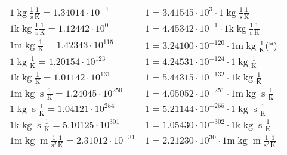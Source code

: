 \begin{center}
\begin{longtable}{l l}
{\color{black}$1 \bm{\mathrm{ }}\operatorname{kg}{}\frac1{\operatorname{s}}{}\frac1{\operatorname{K}} = 1.34014\cdot10^{-4} $}   & {\color{black}$ 1 = 3.41545\cdot10^{3} \cdot 1 \bm{\mathrm{ }}\operatorname{kg}{}\frac1{\operatorname{s}}{}\frac1{\operatorname{K}}$}  \\
{\color{gray}$1 \bm{\mathrm{ k}}\operatorname{kg}{}\frac1{\operatorname{s}}{}\frac1{\operatorname{K}} = 1.12442\cdot10^{0} $}   & {\color{gray}$ 1 = 4.45342\cdot10^{-1} \cdot 1 \bm{\mathrm{ k}}\operatorname{kg}{}\frac1{\operatorname{s}}{}\frac1{\operatorname{K}}$}  \\
{\color{gray}$1 \bm{\mathrm{ m}}\operatorname{kg}{}{}{}\frac1{\operatorname{K}} = 1.42343\cdot10^{115} $}   & {\color{gray}$ 1 = 3.24100\cdot10^{-120} \cdot 1 \bm{\mathrm{ m}}\operatorname{kg}{}{}{}\frac1{\operatorname{K}}$}\quad(*)\\
{\color{black}$1 \bm{\mathrm{ }}\operatorname{kg}{}{}{}\frac1{\operatorname{K}} = 1.20154\cdot10^{123} $}   & {\color{black}$ 1 = 4.24531\cdot10^{-124} \cdot 1 \bm{\mathrm{ }}\operatorname{kg}{}{}{}\frac1{\operatorname{K}}$}  \\
{\color{gray}$1 \bm{\mathrm{ k}}\operatorname{kg}{}{}{}\frac1{\operatorname{K}} = 1.01142\cdot10^{131} $}   & {\color{gray}$ 1 = 5.44315\cdot10^{-132} \cdot 1 \bm{\mathrm{ k}}\operatorname{kg}{}{}{}\frac1{\operatorname{K}}$}  \\
{\color{gray}$1 \bm{\mathrm{ m}}\operatorname{kg}{}{\operatorname{s}}{}\frac1{\operatorname{K}} = 1.24045\cdot10^{250} $}   & {\color{gray}$ 1 = 4.05052\cdot10^{-251} \cdot 1 \bm{\mathrm{ m}}\operatorname{kg}{}{\operatorname{s}}{}\frac1{\operatorname{K}}$}  \\
{\color{black}$1 \bm{\mathrm{ }}\operatorname{kg}{}{\operatorname{s}}{}\frac1{\operatorname{K}} = 1.04121\cdot10^{254} $}   & {\color{black}$ 1 = 5.21144\cdot10^{-255} \cdot 1 \bm{\mathrm{ }}\operatorname{kg}{}{\operatorname{s}}{}\frac1{\operatorname{K}}$}  \\
{\color{gray}$1 \bm{\mathrm{ k}}\operatorname{kg}{}{\operatorname{s}}{}\frac1{\operatorname{K}} = 5.10125\cdot10^{301} $}   & {\color{gray}$ 1 = 1.05430\cdot10^{-302} \cdot 1 \bm{\mathrm{ k}}\operatorname{kg}{}{\operatorname{s}}{}\frac1{\operatorname{K}}$}  \\
{\color{gray}$1 \bm{\mathrm{ m}}\operatorname{kg}{\operatorname{m}}\frac1{\operatorname{s}^2}{}\frac1{\operatorname{K}} = 2.31012\cdot10^{-31} $}   & {\color{gray}$ 1 = 2.21230\cdot10^{30} \cdot 1 \bm{\mathrm{ m}}\operatorname{kg}{\operatorname{m}}\frac1{\operatorname{s}^2}{}\frac1{\operatorname{K}}$}  \\

\end{longtable}
\end{center}
